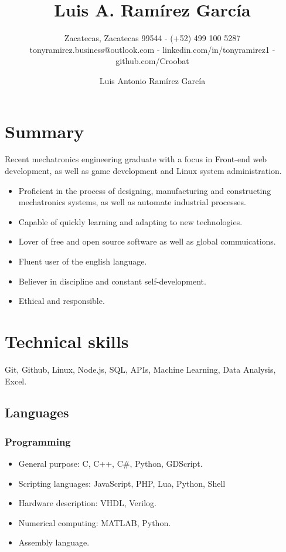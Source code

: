 \documentclass{scrartcl}
\author{Luis Antonio Ramírez García}
\title{Luis A. Ramírez García}
\subtitle{ Zacatecas, Zacatecas 99544 - (+52) 499 100 5287 tonyramirez.business@outlook.com - linkedin.com/in/tonyramirez1 - github.com/Croobat }
\author{}
\date{}
\begin{document}
  \maketitle

  \section{Summary}

  Recent mechatronics engineering graduate with a focus in Front-end web development, as well as game development and Linux system administration.

  \begin{itemize}
    \item Proficient in the process of designing, manufacturing and constructing mechatronics systems, as well as automate industrial processes.

    \item Capable of quickly learning and adapting to new technologies.

    \item Lover of free and open source software as well as global commuications.

    \item Fluent user of the english language.

    \item Believer in discipline and constant self-development.

    \item Ethical and responsible.
  \end{itemize}


  \section{Technical skills}

  Git, Github, Linux, Node.js, SQL, APIs, Machine Learning, Data Analysis, Excel.

    \subsection{Languages}

    \subsubsection{Programming}

    \begin{itemize}
      \item General purpose: C, C++, C\#, Python, GDScript.
      \item Scripting languages: JavaScript, PHP, Lua, Python, Shell
      \item Hardware description: VHDL, Verilog.
      \item Numerical computing: MATLAB, Python.
      \item Assembly language.
    \end{itemize}
\end{document}
